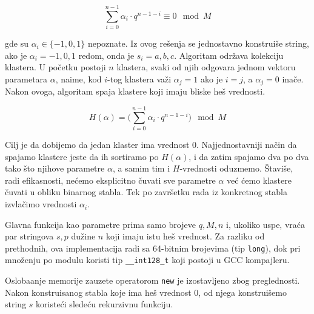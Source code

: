 \begin{equation}
    \sum_{i=0}^{n-1} \alpha_i \cdot q^{n-1-i} \equiv 0 \mod M
\end{equation}

gde su $\alpha_i \in \{-1, 0, 1\}$ nepoznate. Iz ovog re\v senja se jednostavno konstrui\v se string, ako je $\alpha_i = -1,0,1$ redom, onda je $s_i = a,b,c$. Algoritam odr\v zava kolekciju klastera. U po\v cetku postoji $n$ klastera, svaki od njih odgovara jednom vektoru parametara $\alpha$, naime, kod $i$-tog klastera va\v zi $\alpha_j = 1$ ako je $i=j$, a $\alpha_j = 0$ ina\v ce. Nakon ovoga, algoritam spaja klastere koji imaju bliske he\v s vrednosti.

\begin{equation}
    H(\alpha) = \Big(\sum_{i=0}^{n-1} \alpha_i \cdot q^{n-1-i}\Big) \mod M
\end{equation}

Cilj je da dobijemo da jedan klaster ima vrednost $0$. Najjednostavniji na\v cin da spajamo klastere jeste da ih sortiramo po $H(\alpha)$, i da zatim spajamo dva po dva tako \v sto njihove parametre $\alpha$, a samim tim i $H$-vrednosti oduzmemo. \v Stavi\v se, radi efikasnosti, ne\' cemo eksplicitno \v cuvati sve parametre $\alpha$ ve\' c \' cemo klastere \v cuvati u obliku binarnog stabla. Tek po zavr\v setku rada iz konkretnog stabla izvla\v cimo vrednosti $\alpha_i$.

\noindent
\begin{minipage}[l]{\textwidth}

\end{minipage}

Glavna funkcija kao parametre prima samo brojeve $q,M,n$ i, ukoliko uspe, vra\' ca par stringova $s,p$ du\v zine $n$ koji imaju istu he\v s vrednost. Za razliku od prethodnih, ova implementacija radi sa 64-bitnim brojevima (tip \texttt{long}), dok pri mno\v zenju po modulu koristi tip \texttt{\_\_int128\_t} koji postoji u GCC kompajleru.

\noindent
\begin{minipage}[l]{\textwidth}

\end{minipage}

Osloba\dj anje memorije zauzete operatorom \texttt{new} je izostavljeno zbog preglednosti. Nakon konstruisanog stabla koje ima he\v s vrednost $0$, od njega konstrui\v semo string $s$ koriste\' ci slede\' cu rekurzivnu funkciju.

